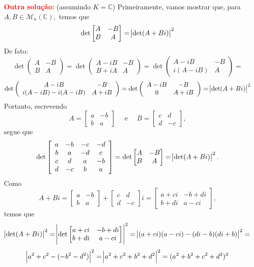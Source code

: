 \documentclass[11pt,a4paper]{article}
\begin{document}
\textbf{\textcolor{Red}{Outra solução:}} (assumindo $K = \mathbb{C}$) Primeiramente, vamos mostrar que, para $A, B \in \mathcal{M}_n(\mathbb{C}),$ temos que
\[
\det \begin{bmatrix} A & -B \\ B & A \end{bmatrix} = \abs{\det(A + Bi)}^2
\]
De fato:
\[\det \left(\begin{array}{cc} A & -B\\B & A\end{array}\right)=\det\left(\begin{array}{cc} A-iB & -B\\B+iA & A\end{array}\right)= \det\left(\begin{array}{cc} A - iB & -B\\i(A - iB) & A\end{array}\right)= \]\[\det\left(\begin{array}{cc} A - iB & -B\\i  (A - iB) -i (A - iB) & A +i B\end{array}\right)= \det \left(\begin{array}{cc}  A - iB & -B\\0 &  A + iB\end{array}\right)=\abs{\det(A + Bi)}^2\]
Portanto, escrevendo
\[
A = \begin{bmatrix} a & -b \\ b & a \end{bmatrix} \quad \mbox{ e } \quad B = \begin{bmatrix} c & d \\ d & -c \end{bmatrix},
\]
segue que 
\[
\det \left[ \begin{array}{cccc} a & -b & -c & -d \\ b & a & -d & c \\ c & d & a & -b \\ d & -c & b & a \end{array} \right] = \det \begin{bmatrix} A & -B \\ B & A \end{bmatrix} = \abs{\det(A + Bi)}^2.\]
Como 
\[
A + Bi =  \begin{bmatrix} a & -b \\ b & a \end{bmatrix} + \begin{bmatrix} c & d \\ d & -c \end{bmatrix}i =  \begin{bmatrix} a + ci & -b + di \\ b+di & a - ci \end{bmatrix},
\]
temos que
\[
\abs{\det(A + Bi)}^2 = \abs{\det \begin{bmatrix} a + ci & -b + di \\ b+di & a - ci \end{bmatrix}}^2 = \abs{(a+ci)(a-ci) - (di - b)(di+b)}^2  = \]\[\abs{a^2 + c^2 - (- b^2 - d^2)}^2 = \abs{a^2 + c^2 + b^2 + d^2}^2 = (a^2 + b^2 + c^2 + d^2)^2
\]
\end{document}
